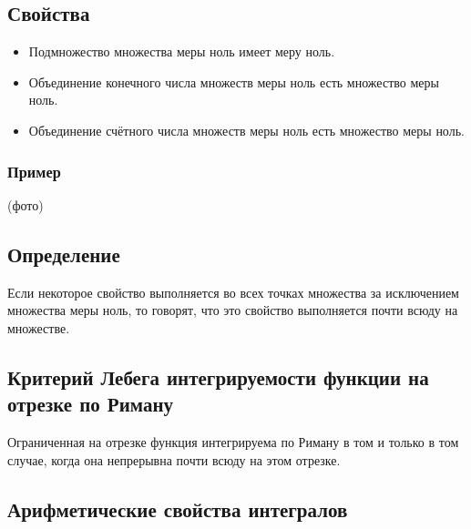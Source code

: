 \documentclass{article}
\begin{document}
\subsection{Свойства}
\begin{itemize}
    \item Подмножество множества меры ноль имеет меру ноль.
    \item Объединение конечного числа множеств меры ноль есть множество меры ноль.
    \item Объединение счётного числа множеств меры ноль есть множество меры ноль.
\end{itemize}

\subsubsection{Пример}
(фото)


\subsection{Определение}
Если некоторое свойство выполняется во всех точках множества за исключением множества меры ноль, 
то говорят, что это свойство выполняется почти всюду на множестве.



\subsection{Критерий Лебега интегрируемости функции на отрезке по Риману}
Ограниченная на отрезке функция интегрируема по Риману в том и только в том случае, 
когда она непрерывна почти всюду на этом отрезке.


\subsection{Арифметические свойства интегралов}
\end{document}
